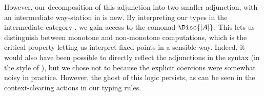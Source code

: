However, our decomposition of this adjunction into two smaller
adjunction, with an intermediate way-station in \cPoset is new. By
interpreting our types in the intermediate category \cPoset, we gain
access to the comonad $\Disc{|A|}$. This lets us distinguish between
monotone and non-monotone computations, which is the critical property
letting us interpret fixed points in a sensible way. Indeed, it would
also have been possible to directly reflect the adjunctions in the
syntax (in the style of \citet{lnl}), but we chose not to because the
explicit coercions were somewhat noisy in practice. However, the ghost
of this logic persists, as can be seen in the context-clearing actions
in our typing rules.


